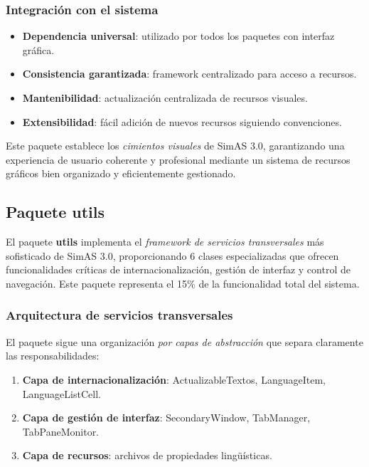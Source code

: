 \subsubsection{Integración con el sistema}

\begin{itemize}
    \item \textbf{Dependencia universal}: utilizado por todos los paquetes con interfaz gráfica.
    \item \textbf{Consistencia garantizada}: framework centralizado para acceso a recursos.
    \item \textbf{Mantenibilidad}: actualización centralizada de recursos visuales.
    \item \textbf{Extensibilidad}: fácil adición de nuevos recursos siguiendo convenciones.
\end{itemize}

Este paquete establece los \textit{cimientos visuales} de SimAS 3.0, garantizando una experiencia de usuario coherente y profesional mediante un sistema de recursos gráficos bien organizado y eficientemente gestionado.

\subsection{Paquete utils}

El paquete \textbf{utils} implementa el \textit{framework de servicios transversales} más sofisticado de SimAS 3.0, proporcionando 6 clases especializadas que ofrecen funcionalidades críticas de internacionalización, gestión de interfaz y control de navegación. Este paquete representa el 15\% de la funcionalidad total del sistema.

\subsubsection{Arquitectura de servicios transversales}

El paquete sigue una organización \textit{por capas de abstracción} que separa claramente las responsabilidades:

\begin{enumerate}
    \item \textbf{Capa de internacionalización}: ActualizableTextos, LanguageItem, LanguageListCell.
    \item \textbf{Capa de gestión de interfaz}: SecondaryWindow, TabManager, TabPaneMonitor.
    \item \textbf{Capa de recursos}: archivos de propiedades lingüísticas.
\end{enumerate}

